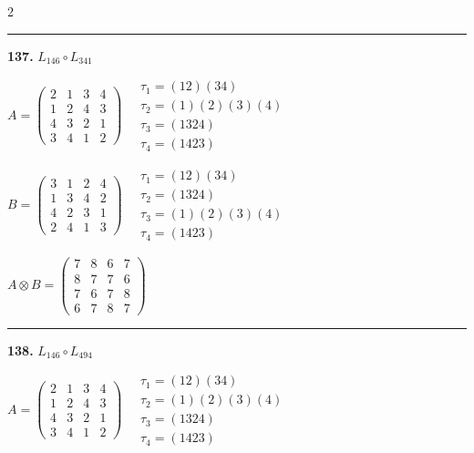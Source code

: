 \begin{multicols}{2}
\vspace{0.3em}
\hrule
\vspace{0.3em}

\noindent\textbf{137.} $L_{146} \circ L_{341}$

$A = \begin{pmatrix} 2 & 1 & 3 & 4 \\ 1 & 2 & 4 & 3 \\ 4 & 3 & 2 & 1 \\ 3 & 4 & 1 & 2 \end{pmatrix} \quad \begin{matrix} \tau_{1}=(1 2)(3 4) \\ \tau_{2}=(1)(2)(3)(4) \\ \tau_{3}=(1 3 2 4) \\ \tau_{4}=(1 4 2 3) \end{matrix}$

$B = \begin{pmatrix} 3 & 1 & 2 & 4 \\ 1 & 3 & 4 & 2 \\ 4 & 2 & 3 & 1 \\ 2 & 4 & 1 & 3 \end{pmatrix} \quad \begin{matrix} \tau_{1}=(1 2)(3 4) \\ \tau_{2}=(1 3 2 4) \\ \tau_{3}=(1)(2)(3)(4) \\ \tau_{4}=(1 4 2 3) \end{matrix}$

$A \otimes B = \begin{pmatrix} 7 & 8 & 6 & 7 \\ 8 & 7 & 7 & 6 \\ 7 & 6 & 7 & 8 \\ 6 & 7 & 8 & 7 \end{pmatrix}$

\vspace{0.3em}
\hrule
\vspace{0.3em}

\noindent\textbf{138.} $L_{146} \circ L_{494}$

$A = \begin{pmatrix} 2 & 1 & 3 & 4 \\ 1 & 2 & 4 & 3 \\ 4 & 3 & 2 & 1 \\ 3 & 4 & 1 & 2 \end{pmatrix} \quad \begin{matrix} \tau_{1}=(1 2)(3 4) \\ \tau_{2}=(1)(2)(3)(4) \\ \tau_{3}=(1 3 2 4) \\ \tau_{4}=(1 4 2 3) \end{matrix}$


\end{multicols}
